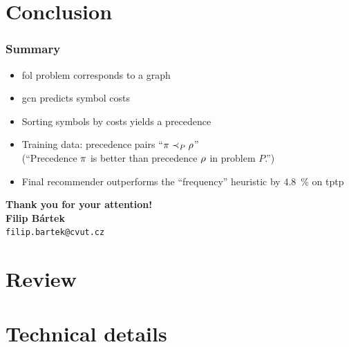 \documentclass[a4paper]{beamer}
\makeatletter
\newcommand\Email{filip.bartek@cvut.cz}
\makeatother
\begin{document}
\section{Conclusion}
\begin{frame}
\frametitle{Summary}
\begin{itemize}
\item \Acrfull{fol} problem corresponds to a graph
\item \Acrfull{gcn} predicts symbol costs
\item Sorting symbols by costs yields a precedence
\item Training data: precedence pairs ``$\pi \prec_{P} \rho$'' \\
(``Precedence $\pi$ is better than precedence $\rho$ in problem $P$.'')
\item Final recommender outperforms the ``frequency'' heuristic by \SI{4.8}{\percent} on \acrshort{tptp}
\end{itemize}
\end{frame}

\begin{frame}
\begin{center}
\vspace*{1cm}
{\bf Thank you for your attention!}\\
\vspace*{2cm}
{\bf\Large Filip Bártek}\\
{\tt \Email}
\vspace*{1cm}
\end{center}

\end{frame}
%
\appendix

\section{Review}


\section{Technical details}
\end{document}
